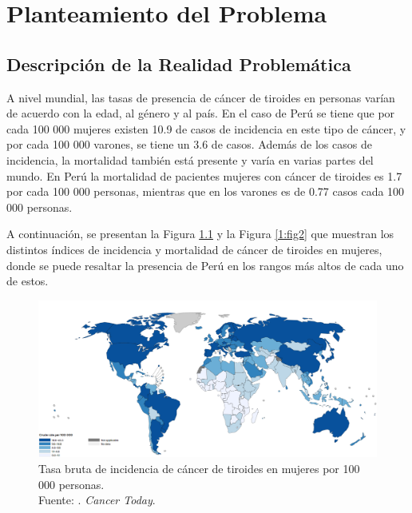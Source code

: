 \chapter{Planteamiento del Problema}
\section{Descripción de la Realidad Problemática}

A nivel mundial, las tasas de presencia de cáncer de tiroides en personas varían de acuerdo con la edad, al género y al país. En el caso de Perú se tiene que por cada 100 000 mujeres existen 10.9 de casos de incidencia en este tipo de cáncer, y por cada 100 000 varones, se tiene un 3.6 de casos. Además de los casos de incidencia, la mortalidad también está presente y varía en varias partes del mundo. En Perú la mortalidad de pacientes mujeres con cáncer de tiroides es 1.7 por cada 100 000 personas, mientras que en los varones es de 0.77 casos cada 100 000 personas. \parencite{ws_oms2022cancert}

A continuación, se presentan la Figura \ref{1:fig} y la Figura \ref{1:fig2} que muestran los distintos índices de incidencia y mortalidad de cáncer de tiroides en mujeres, donde se puede resaltar la presencia de Perú en los rangos más altos de cada uno de estos. 

\begin{figure}[H]
	\begin{center}
		\includegraphics[width=1.00 \textwidth]{1/figures/tb_inc_ct_mujeres.png}
		\caption[Tasa bruta de incidencia de cáncer de tiroides en mujeres por 100 000 personas]{Tasa bruta de incidencia de cáncer de tiroides en mujeres por 100 000 personas. \\
		Fuente: \cite{ws_oms2022cancert}. \textit{Cancer Today}.}
		\label{1:fig}
	\end{center}
\end{figure}


